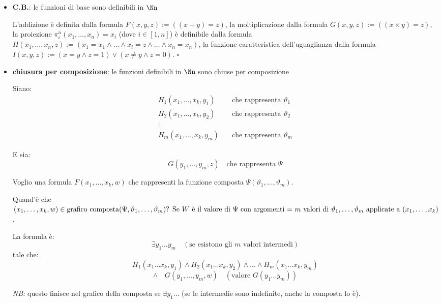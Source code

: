 \documentclass[a4paper,11pt]{report}
\begin{document}
\begin{proofframe}[title=per induzione]
    \begin{itemize}
        \item \textbf{C.B.}: le funzioni di base sono definibili in \( \Nn \)

            \subitem L'addizione è definita dalla formula \( F(x, y, z) := ((x + y) = z) \), la moltiplicazione dalla formula \( G(x, y, z) := ((x \times y) = z) \), la proiezione \( \pi_{i}^{n}(x_1, \dots, x_n) = x_i \) (dove \( i \in [1, n] \)) è definibile dalla formula \( H(x_1, \dots, x_n, z) := (x_1 = x_1 \land \dots \wedge x_i = z \wedge \dots \wedge x_n = x_n) \), la funzione caratteristica dell'uguaglianza dalla formula \( I(x, y, z) := (x = y \wedge z = 1) \lor (x \neq y \wedge z = 0) \). \hfill \(\square\)

        \item \textbf{chiusura per composizione}: le funzioni definibili in \( \Nn \) sono chiuse per composizione

Siano:
\begin{align*}
    H_1(x_1, \dots, x_k, y_1) & \quad \text{che rappresenta } \vartheta_1 \\
    H_2(x_1, \dots, x_k, y_2) & \quad \text{che rappresenta } \vartheta_2 \\
    \vdots & \\
    H_m(x_1, \dots, x_k, y_m) & \quad \text{che rappresenta } \vartheta_m
\end{align*}

E sia:
\[
G(y_1, \dots, y_m, z) \quad \text{che rappresenta } \Psi
\]

Voglio una formula $F(x_1, \dots, x_k, w)$ che rappresenti la funzione composta $\Psi(\vartheta_1, \dots, \vartheta_m)$.

Quand'è che \((x_1, \dots, x_k, w) \in \text{grafico composta}(\Psi, \vartheta_1, \dots, \vartheta_m)$? Se $W$ è il valore di $\Psi$ con argomenti = $m$ valori di $\vartheta_1, \dots, \vartheta_m$ applicate a $(x_1, \dots, x_k)\).

La formula è:
\[
\exists y_1 \dots y_m \quad (\text{se esistono gli } m \text{ valori intermedi})
\]
tale che:
\[
H_1(x_1 \dots x_k, y_1) \land H_2(x_1 \dots x_k, y_2) \land \dots \land H_m(x_1 \dots x_k, y_m)
\]
\[
\land \quad G(y_1, \dots, y_m, w) \quad (\text{valore } G(y_1 \dots y_m))
\]

\textit{NB:} questo finisce nel grafico della composta se \(\exists y_1 \dots\) (se le intermedie sono indefinite, anche la composta lo è).


\end{itemize}
\end{proofframe}
\end{document}

